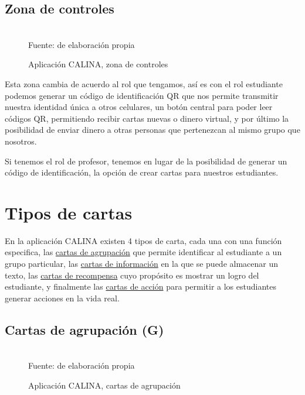 \subsection{Zona de controles}

\begin{figure}[!htb]
\caption[]{Aplicación CALINA, zona de controles}
\centering
{}
\hfill
{}
\\
{\footnotesize Fuente: de elaboración propia}
\end{figure}

Esta zona cambia de acuerdo al rol que tengamos, así es con el rol estudiante podemos generar un código de 
identificación QR que nos permite transmitir nuestra identidad única a otros celulares, un botón central para 
poder leer códigos QR, permitiendo recibir cartas nuevas o dinero virtual, y por último la posibilidad de 
enviar dinero a otras personas que pertenezcan al mismo grupo que nosotros.

Si tenemos el rol de profesor, tenemos en lugar de la posibilidad de generar un código de identificación, la 
opción de crear cartas para nuestros estudiantes.

\section{Tipos de cartas}

En la aplicación CALINA existen 4 tipos de carta, cada una con una función especifica, las \uline{cartas de 
agrupación} que permite identificar al estudiante a un grupo particular, las \uline{cartas de información} en 
la que se puede almacenar un texto, las \uline{cartas de recompensa} cuyo propósito es mostrar un logro del 
estudiante, y finalmente las \uline{cartas de acción} para permitir a los estudiantes generar acciones en la 
vida real.

\subsection{Cartas de agrupación (G)}

\begin{figure}[!htb]
\caption[]{Aplicación CALINA, cartas de agrupación}
\centering
{}
\hspace{2cm}
\\
{\footnotesize Fuente: de elaboración propia}
\end{figure}

